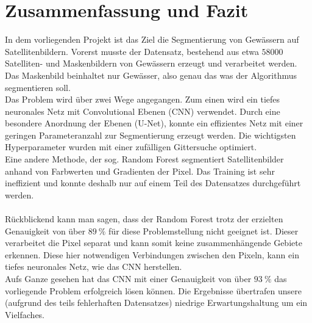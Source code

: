 \section{Zusammenfassung und Fazit}
\label{sec:zusammenfassung}
In dem vorliegenden Projekt ist das Ziel die Segmentierung von Gewässern auf Satellitenbildern.
Vorerst musste der Datensatz, bestehend aus etwa $\SI{58000}{}$ Satelliten- und Maskenbildern von Gewässern erzeugt und verarbeitet werden.
Das Maskenbild beinhaltet nur Gewässer, also genau das was der Algorithmus segmentieren soll.
\\
Das Problem wird über zwei Wege angegangen.
Zum einen wird ein tiefes neuronales Netz mit Convolutional Ebenen (CNN) verwendet.
Durch eine besondere Anordnung der Ebenen (U-Net), konnte ein effizientes Netz mit einer geringen Parameteranzahl zur Segmentierung erzeugt werden.
Die wichtigsten Hyperparameter wurden mit einer zufälligen Gittersuche optimiert.
\\
Eine andere Methode, der sog. Random Forest segmentiert Satellitenbilder anhand von Farbwerten und Gradienten der Pixel.
Das Training ist sehr ineffizient und konnte deshalb nur auf einem Teil des Datensatzes durchgeführt werden.
\\
\\
Rückblickend kann man sagen, dass der Random Forest trotz der erzielten Genauigkeit von über $\SI{89}{\percent}$ für diese Problemstellung nicht geeignet ist.
Dieser verarbeitet die Pixel separat und kann somit keine zusammenhängende Gebiete erkennen.
Diese hier notwendigen Verbindungen zwischen den Pixeln, kann ein tiefes neuronales Netz, wie das CNN herstellen.
\\
Aufs Ganze gesehen hat das CNN mit einer Genauigkeit von über $\SI{93}{\percent}$ das vorliegende Problem erfolgreich lösen können.
Die Ergebnisse übertrafen unsere (aufgrund des teils fehlerhaften Datensatzes) niedrige Erwartungshaltung um ein Vielfaches.